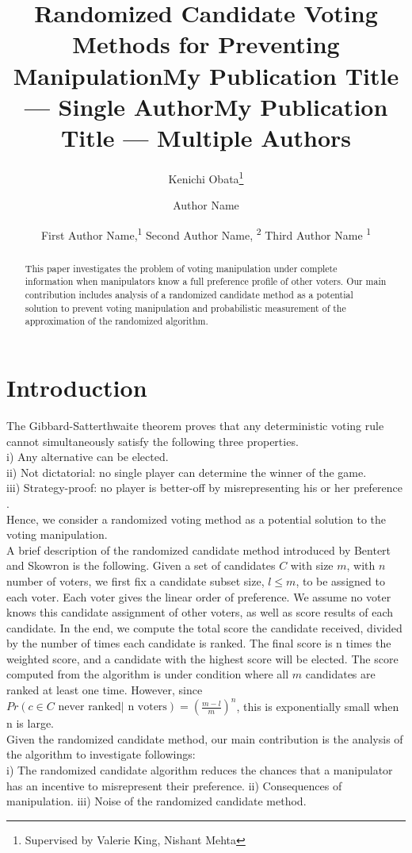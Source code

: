 \documentclass[letterpaper]{article} %
\title{Randomized Candidate Voting Methods for Preventing Manipulation}
\author{
    Kenichi Obata\thanks{Supervised by Valerie King, Nishant Mehta}
    \\
}
\title{My Publication Title --- Single Author}
\author {
    Author Name \\
}
\title{My Publication Title --- Multiple Authors}
\author {

        First Author Name,\textsuperscript{\rm 1}
        Second Author Name, \textsuperscript{\rm 2}
        Third Author Name \textsuperscript{\rm 1} \\
}
\begin{document}
\maketitle

\begin{abstract}
This paper investigates the problem of voting manipulation under complete information when manipulators know a full preference profile of other voters. Our main contribution includes analysis of a randomized candidate method as a potential solution to prevent voting manipulation and probabilistic measurement of the approximation of the randomized algorithm.
\end{abstract}

\section{Introduction}
The Gibbard-Satterthwaite theorem proves that any deterministic voting rule cannot simultaneously satisfy the following three properties.\\
i) Any alternative can be elected. \\
ii) Not dictatorial: no single player can determine the winner of the game. \\
iii) Strategy-proof: no player is better-off by misrepresenting his or her preference \cite{Satterthwaite}.\\
Hence, we consider a randomized voting method as a potential solution to the voting manipulation.\\
A brief description of the randomized candidate method introduced by Bentert and Skowron is the following. Given a set of candidates $C$ with size $m$, with $n$ number of voters, we first fix a candidate subset size, $l \le m$, to be assigned to each voter. Each voter gives the linear order of preference. We assume no voter knows this candidate assignment of other voters, as well as score results of each candidate. In the end, we compute the total score the candidate received, divided by the number of times each candidate is ranked. The final score is n times the weighted score, and a candidate with the highest score will be elected. The score computed from the algorithm is under condition where all $m$ candidates are ranked at least one time. However, since $Pr(c \in C \text{ never ranked}| \text{ n voters}) = (\frac{m-l}{m})^n$,  this is exponentially small when n is large.\\
Given the randomized candidate method, our main contribution is the analysis of the algorithm to investigate followings: \\
i) The randomized candidate algorithm reduces the chances that a manipulator has an incentive to misrepresent their preference. ii) Consequences of manipulation. iii) Noise of the randomized candidate method. 
\end{document}
